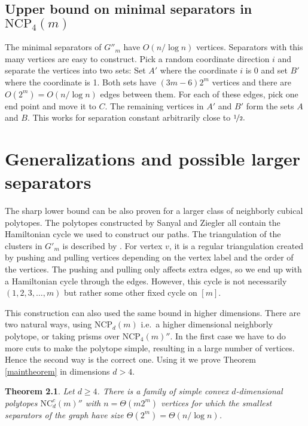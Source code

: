 \documentclass[a4paper,12pt]{book}
\theoremstyle{plain}
\newtheorem{theorem}{Theorem}[section]
\theoremstyle{definition}
\newcommand\NC{\textrm{NCP}}
\newcommand\NCC{\mathrm{NC}^c}
\begin{document}
\section{Upper bound on minimal separators in $\NC_4(m)$}

The minimal separators of $G''_m$ have $O(n/\log n)$ vertices. Separators with this
many vertices are easy to construct. Pick a random coordinate direction $i$ and separate
the vertices into two sets: Set $A'$ where the coordinate $i$ is 0 and set $B'$ where the coordinate
is 1. Both sets have $(3m-6)2^m$ vertices and there are $O(2^m) = O(n/\log n)$ edges between them. For each of
these edges, pick one end point and move it to $C$. The remaining vertices in $A'$ and $B'$ form
the sets $A$ and $B$. This works for separation constant arbitrarily close to $\nicefrac{1}{2}.$

\chapter{Generalizations and possible larger separators}
\label{genes}

The sharp lower bound can be also proven for a larger class of neighborly cubical polytopes.
The polytopes constructed by Sanyal and Ziegler \cite{Z102} all contain the Hamiltonian
cycle we used to construct our paths. The triangulation of the clusters in $G'_m$ is described by
\cite[Thm 3.7.]{Z102}. For vertex $v$, it is a regular triangulation created by pushing 
and pulling vertices depending on the vertex label and the order of the vertices. 
The pushing and pulling only affects extra edges, so we end up with a Hamiltonian
cycle through the edges. However, this cycle is not necessarily $(1,2,3,\dots,m)$ but
rather some other fixed cycle on $[m]$.

This construction can also used the same bound in higher dimensions. There are two 
natural ways, using $\NC_d(m)$ i.e.\ a higher dimensional neighborly polytope, or 
taking prisms over $\NC_4(m)''$.  In the first case we have to do more cuts to 
make the polytope simple, resulting in a large number of vertices. Hence the 
second way is the correct one. Using it we prove Theorem \ref{maintheorem}
in dimensions $d>4$.

\begin{theorem}
Let $d\ge 4$.
There is a family of simple convex $d$-dimensional polytopes $\NCC_d(m)''$ with $n=\Theta(m 2^m)$ vertices for which
the smallest separators of the graph have size $\Theta(2^m) = \Theta(n/\log n)$.
\end{theorem}
\end{document}
